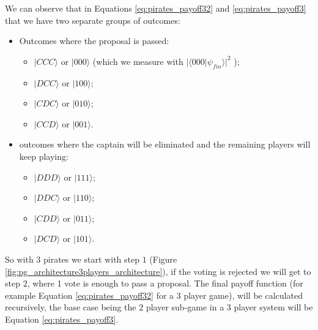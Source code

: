 We can observe that in Equations \ref{eq:pirates_payoff32} and \ref{eq:pirates_payoff3} that we have two separate groups of outcomes: 
\begin{itemize}
\item Outcomes where the proposal is passed:
\begin{itemize}
\item $\vert CCC\rangle$ or $\vert000\rangle$ (which we measure with $\vert\langle000\vert\psi_{fin}\rangle\vert^{2}$ );
\item $\vert DCC\rangle$ or $\vert100\rangle$;
\item $\vert CDC\rangle$ or $\vert010\rangle$;
\item $\vert CCD\rangle$ or $\vert001\rangle$.
\end{itemize}
\item outcomes where the captain will be eliminated and the remaining players will keep playing:
\begin{itemize}
\item $\vert DDD\rangle$ or $\vert111\rangle$;
\item $\vert DDC\rangle$ or $\vert110\rangle$;
\item $\vert CDD\rangle$ or $\vert011\rangle$;
\item $\vert DCD\rangle$ or $\vert101\rangle$.
\end{itemize}
\end{itemize}



So with $3$ pirates we start with step $1$ (Figure \ref{fig:pg_architecture3players_architecture}), if the voting is rejected we will get to step $2$, where 1 vote is enough to pass a proposal. The final payoff function (for example Equation \ref{eq:pirates_payoff32} for a $3$ player game), will be calculated recursively, the base case being the $2$ player sub-game in a $3$ player system will be Equation \ref{eq:pirates_payoff3}.

 

